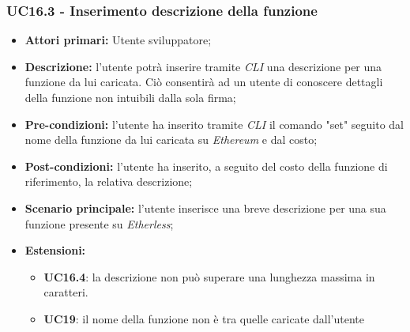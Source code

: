 \subsubsection{UC16.3 - Inserimento descrizione della funzione}
\begin{itemize}
	\item \textbf{Attori primari:} Utente sviluppatore;
	\item \textbf{Descrizione:} l'utente potrà inserire tramite \textit{CLI\glo} una descrizione per una funzione da lui caricata. Ciò consentirà ad un utente di conoscere dettagli della funzione non intuibili dalla sola firma;
	\item \textbf{Pre-condizioni:} l'utente ha inserito tramite \textit{CLI\glo} il comando "set" seguito dal nome della funzione da lui caricata su \textit{Ethereum\glo} e dal costo;
	\item \textbf{Post-condizioni:} l'utente ha inserito, a seguito del costo della funzione di riferimento, la relativa descrizione;
	\item \textbf{Scenario principale:} l'utente inserisce una breve descrizione per una sua funzione presente su \textit{Etherless};
	\item \textbf{Estensioni:}
	\begin{itemize}
		\item \textbf{UC16.4}: la descrizione non può superare una lunghezza massima in caratteri.
		\item \textbf{UC19}: il nome della funzione non è tra quelle caricate dall'utente
	\end{itemize}
\end{itemize}
